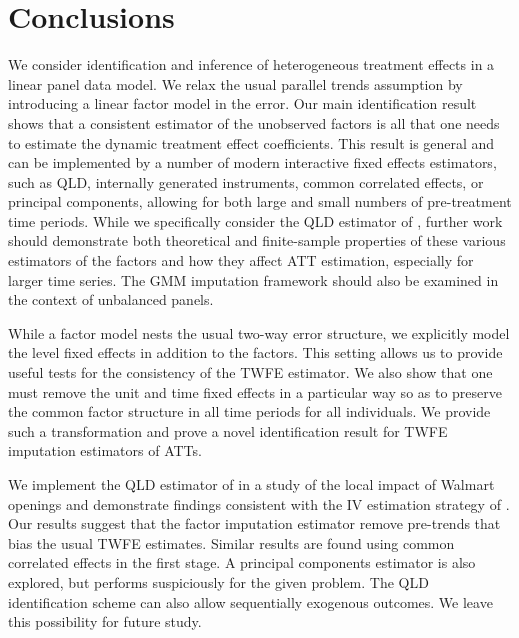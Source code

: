 \documentclass[12pt]{article}
\begin{document}
\section{Conclusions}\label{sec:conclusion}

We consider identification and inference of heterogeneous treatment effects in a linear panel data model. We relax the usual parallel trends assumption by introducing a linear factor model in the error. Our main identification result shows that a consistent estimator of the unobserved factors is all that one needs to estimate the dynamic treatment effect coefficients. This result is general and can be implemented by a number of modern interactive fixed effects estimators, such as QLD, internally generated instruments, common correlated effects, or principal components, allowing for both large and small numbers of pre-treatment time periods. While we specifically consider the QLD estimator of \citet{Ahn_Lee_Schmidt_2013}, further work should demonstrate both theoretical and finite-sample properties of these various estimators of the factors and how they affect ATT estimation, especially for larger time series. The GMM imputation framework should also be examined in the context of unbalanced panels.

While a factor model nests the usual two-way error structure, we explicitly model the level fixed effects in addition to the factors. This setting allows us to provide useful tests for the consistency of the TWFE estimator. We also show that one must remove the unit and time fixed effects in a particular way so as to preserve the common factor structure in all time periods for all individuals. We provide such a transformation and prove a novel identification result for TWFE imputation estimators of ATTs.

We implement the QLD estimator of \citet{Ahn_Lee_Schmidt_2013} in a study of the local impact of Walmart openings and demonstrate findings consistent with the IV estimation strategy of \citet{basker2005job}. Our results suggest that the factor imputation estimator remove pre-trends that bias the usual TWFE estimates. Similar results are found using common correlated effects in the first stage. A principal components estimator is also explored, but performs suspiciously for the given problem. The QLD identification scheme can also allow sequentially exogenous outcomes. We leave this possibility for future study. 
\end{document}

